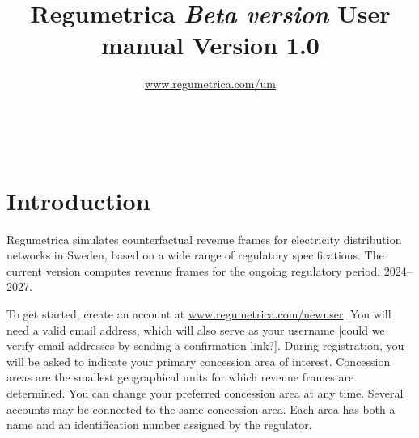 
\graphicspath{ {../graphs/} }
\makeatletter
{}
\makeatother

	\title{Regumetrica \linebreak \emph{Beta version} \linebreak User manual \linebreak Version 1.0 \emph{}  \\} 
	\author{\href{https://www.regumetrica.com/um}{www.regumetrica.com/um} }
	\maketitle
    \begin{center}
 \emph{} \\

	\end{center}
	\begin{singlespace}
	
\end{singlespace}
\setcounter{page}{1}
\doublespacing

\tableofcontents

\newpage
\section*{Introduction}
Regumetrica simulates counterfactual revenue frames for electricity distribution networks in Sweden, based on a wide range of regulatory specifications. The current version computes revenue frames for the ongoing regulatory period, 2024–2027.

To get started, create an account at \href{https://www.regumetrica.com/newuser}{www.regumetrica.com/newuser}. You will need a valid email address, which will also serve as your username [could we verify email addresses by sending a confirmation link?]. During registration, you will be asked to indicate your primary concession area of interest. Concession areas are the smallest geographical units for which revenue frames are determined. You can change your preferred concession area at any time. Several accounts may be connected to the same concession area. Each area has both a name and an identification number assigned by the regulator.

